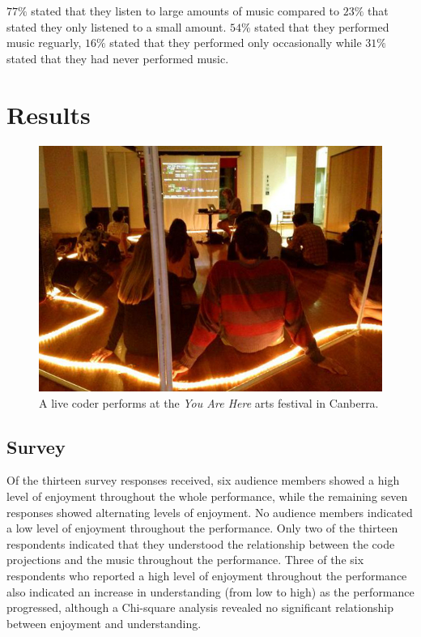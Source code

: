 $77\%$ stated that they listen to large amounts of music compared to $23\%$ that stated they only listened to a small amount. $54\%$ stated that they performed music reguarly, $16\%$ stated that they performed only occasionally while $31\%$ stated that they had never performed music.

\section{Results}

\begin{figure}
\centering
\includegraphics[width=\textwidth]{../images/study-1-you-are-here.jpg}
\caption[\textit{You Are Here} live coding performance]{A live coder performs at the \textit{You Are Here} arts festival in Canberra.}
\label{fig:you-are-here-performance}
\end{figure}

\subsection{Survey}

Of the thirteen survey responses received, six audience members showed a high level of enjoyment throughout the whole performance, while the remaining seven responses showed alternating levels of enjoyment. No audience members indicated a low level of enjoyment throughout the performance.  Only two of the thirteen respondents indicated that they understood the relationship between the code projections and the music throughout the performance. Three of the six respondents who reported a high level of enjoyment throughout the performance also indicated an increase in understanding (from low to high) as the performance progressed, although a Chi-square analysis revealed no significant relationship between enjoyment and understanding. 

